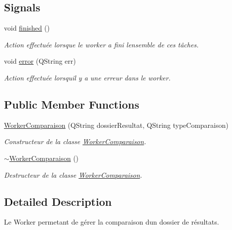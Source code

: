\subsection*{Signals}
\begin{DoxyCompactItemize}
\item 
void \hyperlink{classWorkerComparaison_a22ed9afba5f29d89a014b2b895d995b2}{finished} ()
\begin{DoxyCompactList}\small\item\em Action effectuée lorsque le worker a fini l\textquotesingle{}ensemble de ces tâches. \end{DoxyCompactList}\item 
void \hyperlink{classWorkerComparaison_aa9c167d230b850568f48575bc19241d7}{error} (Q\+String err)
\begin{DoxyCompactList}\small\item\em Action effectuée lorsqu\textquotesingle{}il y a une erreur dans le worker. \end{DoxyCompactList}\end{DoxyCompactItemize}
\subsection*{Public Member Functions}
\begin{DoxyCompactItemize}
\item 
\hyperlink{classWorkerComparaison_ab4c8a73500944f1e13c9008dd6302e80}{Worker\+Comparaison} (Q\+String dossier\+Resultat, Q\+String type\+Comparaison)
\begin{DoxyCompactList}\small\item\em Constructeur de la classe \hyperlink{classWorkerComparaison}{Worker\+Comparaison}. \end{DoxyCompactList}\item 
\hyperlink{classWorkerComparaison_a82acf722e3274431c0f86093c9dcb799}{$\sim$\+Worker\+Comparaison} ()
\begin{DoxyCompactList}\small\item\em Destructeur de la classe \hyperlink{classWorkerComparaison}{Worker\+Comparaison}. \end{DoxyCompactList}\end{DoxyCompactItemize}


\subsection{Detailed Description}
Le Worker permetant de gérer la comparaison d\textquotesingle{}un dossier de résultats. 

